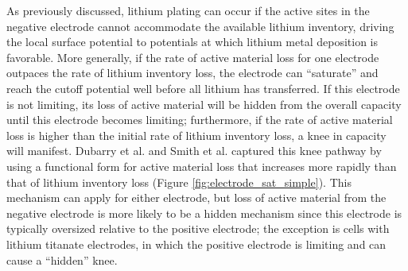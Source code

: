 \documentclass[journal=jpclcd,manuscript=article]{achemso}
\begin{document}
As previously discussed, lithium plating can occur if the active sites in the negative electrode cannot accommodate the available lithium inventory, driving the local surface potential to potentials at which lithium metal deposition is favorable. More generally, if the rate of active material loss for one electrode outpaces the rate of lithium inventory loss, the electrode can ``saturate'' and reach the cutoff potential well before all lithium has transferred. If this electrode is not limiting, its loss of active material will be hidden from the overall capacity until this electrode becomes limiting; furthermore, if the rate of active material loss is higher than the initial rate of lithium inventory loss, a knee in capacity will manifest. Dubarry et al.\cite{dubarry_synthesize_2012} and Smith et al.\cite{smith_life_2017} captured this knee pathway by using a functional form for active material loss that increases more rapidly than that of lithium inventory loss (Figure \ref{fig:electrode_sat_simple}). This mechanism can apply for either electrode, but loss of active material from the negative electrode is more likely to be a hidden mechanism since this electrode is typically oversized relative to the positive electrode; the exception is cells with lithium titanate electrodes, in which the positive electrode is limiting and can cause a ``hidden'' knee\cite{baure_battery_2019, baure_battery_2020}.
\end{document}
